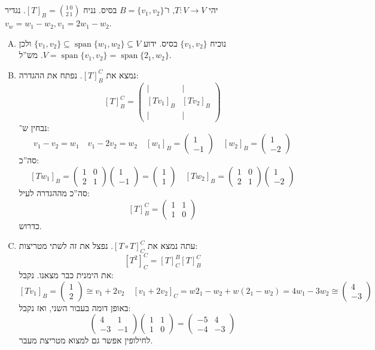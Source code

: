 \documentclass[]{article}
\DeclareMathOperator{\Sp}     {span}
\newcommand\co        {\colon}
\newcommand\pms[1]    {\begin{pmatrix}
		#1
\end{pmatrix}}
\theoremstyle{definition}
\begin{document}
	\section{}
	יהי $T \co V \to V$, ו־$B = \{v_1, v_2\}$ בסיס. נניח $[T]_B = \binom{1\,0}{2\,1}$. נגדיר $v_w = w_1 - w_2, v_1 = 2w_1 - w_2$. 
	\begin{enumerate}[A.]
		\item נוכיח $\{v_1, v_2\}$ בסיס. ידוע $\{v_1, v_2\}\subseteq \Sp\{w_1, w_2\} \subseteq V$ ולכן $V = \Sp\{v_1, v_2\} = \Sp\{2_1, w_2\}$. מש''ל. 
		\item נמצא את $[T]^{C}_B$. נפתח את ההגדרה: 
		\[ [T]^{C}_B = \pms{\vert & \vert \\ [Tv_1]_B & [Tv_2]_B \\ \vert & \vert} \]
		נבחין ש־: 
		\[ v_1 - v_2 = w_1 \quad v_1 - 2v_2 = w_2 \quad [w_1]_B = \pms{1 \\ -1} \quad [w_2]_B = \pms{1 \\ -2} \]
		סה''כ: 
		\[ [Tw_1]_B = \pms{1 & 0 \\ 2 & 1}\pms{1 \\ -1} = \pms{1 \\ 1} \quad [Tw_2]_B = \pms{1 & 0 \\ 2 & 1}\pms{1 \\ -2} \]
		סה''כ מההגדרה לעיל: 
		\[ [T]^C_B = \pms{1 & 1 \\ 1 & 0} \]
		כדרוש. 
		\item עתה נמצא את $[T \circ T]^C_C$. נפצל את זה לשתי מטריצות: 
		\[ [T^2]^C_C = [T]^B_C [T]_B^C \]
		את הימנית כבר מצאנו. 
		נקבל: 
		\[ [Tv_1]_B = \pms{1 \\ 2} \cong v_1 + 2v_2 \quad [v_1 + 2v_2]_C = w2_1 - w_2 + w(2_1 - w_2) = 4w_1 - 3w_2 \cong \pms{4 \\ -3} \]
		באופן דומה בעבור השני, ואז נקבל: 
		\[ \pms{4 & 1 \\ -3 & -1}\pms{1 & 1 \\ 1 & 0} = \pms{-5 & 4 \\ -4 & -3} \]
		לחילופין אפשר גם למצוא מטריצת מעבר. 
	\end{enumerate}
	
\end{document}
